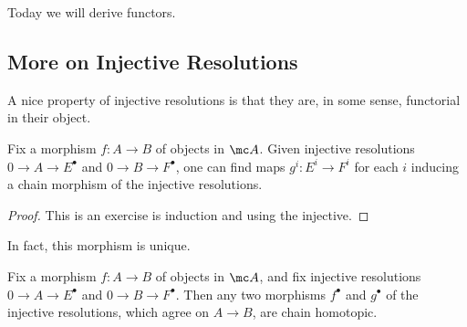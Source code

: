 \documentclass[../notes.tex]{subfiles}
\begin{document}
Today we will derive functors.

\subsection{More on Injective Resolutions}
A nice property of injective resolutions is that they are, in some sense, functorial in their object.
\begin{proposition} \label{prop:inj-res-functorial}
	Fix a morphism $f\colon A\to B$ of objects in $\mc A$. Given injective resolutions $0\to A\to E^\bullet$ and $0\to B\to F^\bullet$, one can find maps $g^i\colon E^i\to F^i$ for each $i$ inducing a chain morphism of the injective resolutions.
\end{proposition}
\begin{proof}
	This is an exercise is induction and using the injective.
\end{proof}
In fact, this morphism is unique.
\begin{proposition} \label{prop:inj-res-functorial-uniq}
	Fix a morphism $f\colon A\to B$ of objects in $\mc A$, and fix injective resolutions $0\to A\to E^\bullet$ and $0\to B\to F^\bullet$. Then any two morphisms $f^\bullet$ and $g^\bullet$ of the injective resolutions, which agree on $A\to B$, are chain homotopic.
\end{proposition}
\end{document}
